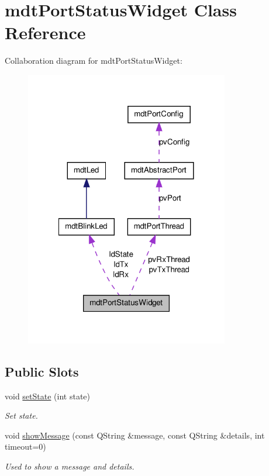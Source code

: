 \hypertarget{classmdt_port_status_widget}{
\section{mdtPortStatusWidget Class Reference}
\label{classmdt_port_status_widget}
}


Collaboration diagram for mdtPortStatusWidget:\nopagebreak
\begin{figure}[H]
\begin{center}
\leavevmode
\includegraphics[width=252pt]{classmdt_port_status_widget__coll__graph}
\end{center}
\end{figure}
\subsection*{Public Slots}
\begin{DoxyCompactItemize}
\item 
void \hyperlink{classmdt_port_status_widget_a356064b89de5c7c8d1c8d5639d1d8f73}{setState} (int state)
\begin{DoxyCompactList}\small\item\em Set state. \end{DoxyCompactList}\item 
void \hyperlink{classmdt_port_status_widget_a8fce28ddb290512f5681cf800ac17b81}{showMessage} (const QString \&message, const QString \&details, int timeout=0)
\begin{DoxyCompactList}\small\item\em Used to show a message and details. \end{DoxyCompactList}\end{DoxyCompactItemize}
